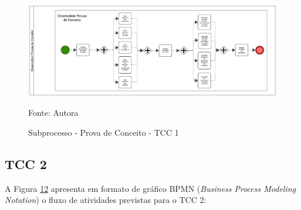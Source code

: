 \begin{figure}[H]
    \centering
    \caption{Subprocesso - Prova de Conceito - TCC 1}
    \label{fig:subproccesstcc1}
    
    \vspace{2pt} %
    
    \includegraphics[width=1.0\textwidth]{figuras/subproccesstcc1.eps}
    
    \vspace{2pt} %
    
    \small Fonte: Autora
\end{figure}

\subsection{TCC 2}\label{subsec:tcc2}

A Figura \hyperref[fig:bpmnTcc2]{12} apresenta em formato de gráfico BPMN (\textit{Business Process Modeling Notation}) 
o fluxo de atividades previstas para o TCC 2:

